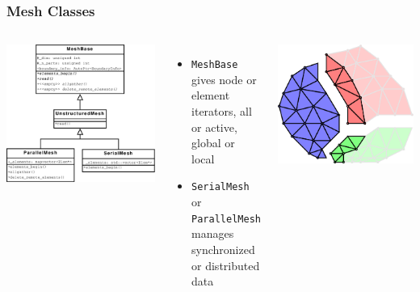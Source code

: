 \documentclass[mathserif]{beamer}
\begin{document}
\begin{frame}
\frametitle{Mesh Classes}
\begin{columns}
\begin{center}
\includegraphics[width=.95\textwidth]{MeshUML}
\end{center}
\begin{itemize}
\item \texttt{MeshBase} gives node or element iterators, all or active, global or local
\item \texttt{SerialMesh} or \texttt{ParallelMesh} manages synchronized or distributed data
\end{itemize}

\includegraphics[width=.75\textwidth]{ParallelMesh3}
\end{columns}

\end{frame}
\end{document}
